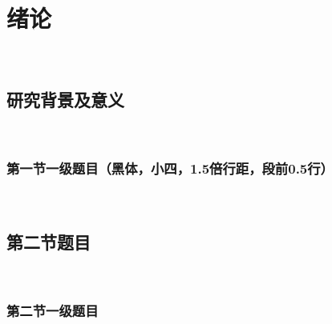 
\chapter{绪论}
\label{chap04}
~\\
\section{研究背景及意义}
~\\
\subsection{第一节一级题目（黑体，小四，1.5倍行距，段前0.5行）}
~\\
\section{第二节题目}
~\\
\subsection{第二节一级题目}
~\\

